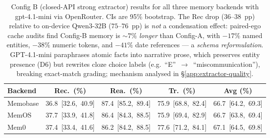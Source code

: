 \begin{table}[h]
\centering
\caption{Config B (closed-API strong extractor) results for all three memory backends with gpt-4.1-mini via OpenRouter. CIs are 95\% bootstrap. The Rec drop ($36$--$38$~pp) relative to on-device Qwen3-32B ($75$--$76$~pp) is \emph{not} a condensation effect: paired-ego cache audits find Config-B memory is ${\sim}7\%$ \emph{longer} than Config-A, with $-17\%$ named entities, $-38\%$ numeric tokens, and $-41\%$ date references --- a \emph{schema reformulation}. GPT-4.1-mini paraphrases atomic facts into narrative prose, which preserves entity presence (D6) but rewrites cloze choice labels (e.g.\ ``E''~$\to$~``miscommunication''), breaking exact-match grading; mechanism analysed in \S\ref{app:extractor-quality}.}
\label{tab:configb}
\footnotesize
\setlength{\tabcolsep}{6pt}
\begin{tabular}{@{}l cccc@{}}
\toprule
\textbf{Backend} & Rec.\ (\%) & Rea.\ (\%) & Tr.\ (\%) & Avg (\%) \\
\midrule
Memobase & 36.8~[32.6,~40.9] & 87.4~[85.2,~89.4] & 75.9~[68.8,~82.4] & 66.7~[64.2,~69.3] \\
MemOS & 37.7~[33.9,~41.8] & 86.4~[84.3,~88.5] & 75.9~[69.4,~82.9] & 66.7~[63.8,~69.4] \\
Mem0 & 37.4~[33.4,~41.6] & 86.2~[84.2,~88.5] & 77.6~[71.2,~84.1] & 67.1~[64.5,~69.8] \\
\bottomrule
\end{tabular}
\end{table}

